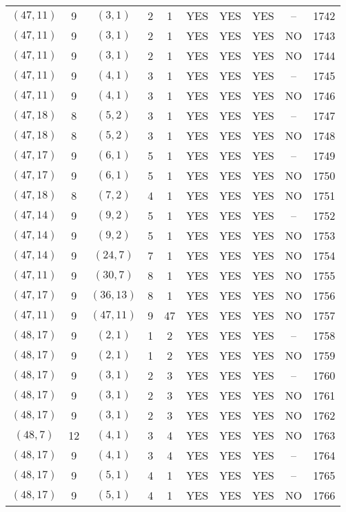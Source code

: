 \begin{longtable}{|c|c|c|c|c|c|c|c|c|c|}
$(47, 11)$ & 9 & $(3, 1)$ & 2 & 1 & YES & YES & YES & -- & 1742\\
$(47, 11)$ & 9 & $(3, 1)$ & 2 & 1 & YES & YES & YES & NO & 1743\\
$(47, 11)$ & 9 & $(3, 1)$ & 2 & 1 & YES & YES & YES & NO & 1744\\
$(47, 11)$ & 9 & $(4, 1)$ & 3 & 1 & YES & YES & YES & -- & 1745\\
$(47, 11)$ & 9 & $(4, 1)$ & 3 & 1 & YES & YES & YES & NO & 1746\\
$(47, 18)$ & 8 & $(5, 2)$ & 3 & 1 & YES & YES & YES & -- & 1747\\
$(47, 18)$ & 8 & $(5, 2)$ & 3 & 1 & YES & YES & YES & NO & 1748\\
$(47, 17)$ & 9 & $(6, 1)$ & 5 & 1 & YES & YES & YES & -- & 1749\\
$(47, 17)$ & 9 & $(6, 1)$ & 5 & 1 & YES & YES & YES & NO & 1750\\
$(47, 18)$ & 8 & $(7, 2)$ & 4 & 1 & YES & YES & YES & NO & 1751\\
$(47, 14)$ & 9 & $(9, 2)$ & 5 & 1 & YES & YES & YES & -- & 1752\\
$(47, 14)$ & 9 & $(9, 2)$ & 5 & 1 & YES & YES & YES & NO & 1753\\
$(47, 14)$ & 9 & $(24, 7)$ & 7 & 1 & YES & YES & YES & NO & 1754\\
$(47, 11)$ & 9 & $(30, 7)$ & 8 & 1 & YES & YES & YES & NO & 1755\\
$(47, 17)$ & 9 & $(36, 13)$ & 8 & 1 & YES & YES & YES & NO & 1756\\
$(47, 11)$ & 9 & $(47, 11)$ & 9 & 47 & YES & YES & YES & NO & 1757\\
$(48, 17)$ & 9 & $(2, 1)$ & 1 & 2 & YES & YES & YES & -- & 1758\\
$(48, 17)$ & 9 & $(2, 1)$ & 1 & 2 & YES & YES & YES & NO & 1759\\
$(48, 17)$ & 9 & $(3, 1)$ & 2 & 3 & YES & YES & YES & -- & 1760\\
$(48, 17)$ & 9 & $(3, 1)$ & 2 & 3 & YES & YES & YES & NO & 1761\\
$(48, 17)$ & 9 & $(3, 1)$ & 2 & 3 & YES & YES & YES & NO & 1762\\
$(48, 7)$ & 12 & $(4, 1)$ & 3 & 4 & YES & YES & YES & NO & 1763\\
$(48, 17)$ & 9 & $(4, 1)$ & 3 & 4 & YES & YES & YES & -- & 1764\\
$(48, 17)$ & 9 & $(5, 1)$ & 4 & 1 & YES & YES & YES & -- & 1765\\
$(48, 17)$ & 9 & $(5, 1)$ & 4 & 1 & YES & YES & YES & NO & 1766\\

\end{longtable}
